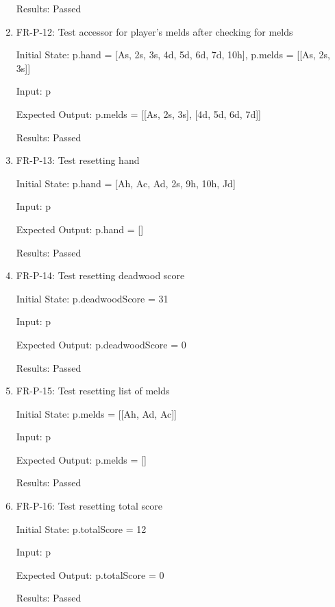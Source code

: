 \documentclass[12pt, titlepage]{article}
\begin{document}
\begin{enumerate}
    Results: Passed
    
    \item FR-P-12: Test accessor for player's melds after checking for melds
    
    Initial State: p.hand = [As, 2s, 3s, 4d, 5d, 6d, 7d, 10h], p.melds = [[As, 2s, 3s]]
    
    Input: p
    
    Expected Output: p.melds = [[As, 2s, 3s], [4d, 5d, 6d, 7d]]
    
    Results: Passed
    
    \item FR-P-13: Test resetting hand
    
    Initial State: p.hand = [Ah, Ac, Ad, 2s, 9h, 10h, Jd]
    
    Input: p
    
    Expected Output: p.hand = []
    
    Results: Passed
    
    \item FR-P-14: Test resetting deadwood score
    
    Initial State: p.deadwoodScore = 31
    
    Input: p
    
    Expected Output: p.deadwoodScore = 0
    
    Results: Passed
    
    \item FR-P-15: Test resetting list of melds
    
    Initial State: p.melds = [[Ah, Ad, Ac]]
    
    Input: p
    
    Expected Output: p.melds = []
    
    Results: Passed
    
    \item FR-P-16: Test resetting total score
    
    Initial State: p.totalScore = 12
    
    Input: p
    
    Expected Output: p.totalScore = 0
    
    Results: Passed
\end{enumerate}
\end{document}
